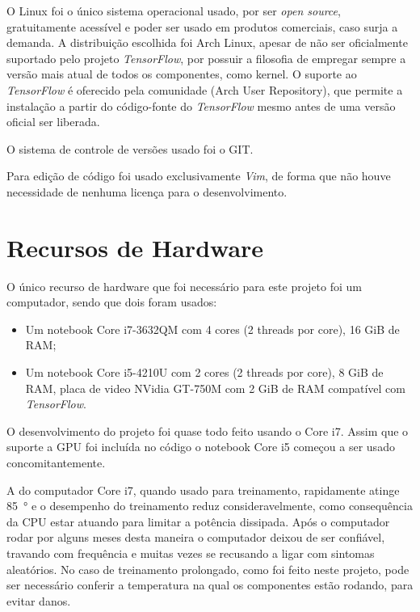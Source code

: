 O Linux foi o único sistema operacional usado, por ser \emph{open source},
gratuitamente acessível e poder ser usado em produtos comerciais, caso surja a
demanda. A distribuição escolhida foi Arch Linux, apesar de não ser
oficialmente suportado pelo projeto \emph{TensorFlow}, por possuir a filosofia
de empregar sempre a versão mais atual de todos os componentes, como kernel. O
suporte ao \emph{TensorFlow} é oferecido pela comunidade
 (Arch User Repository), que permite a instalação a partir do
código-fonte do \emph{TensorFlow} mesmo antes de uma versão oficial ser liberada.

O sistema de controle de versões usado foi o GIT.

Para edição de código foi usado exclusivamente \emph{Vim}, de forma que não
houve necessidade de nenhuma licença para o desenvolvimento.

\section{Recursos de Hardware} \label{sec:cap5_hw}

O único recurso de hardware que foi necessário para este projeto foi
um computador, sendo que dois foram usados:

\begin{itemize}
\item Um notebook Core i7-3632QM com 4 cores (2 threads por core), 16 GiB
	de RAM;
\item Um notebook Core i5-4210U com 2 cores (2 threads por core), 8 GiB de RAM,
	placa de video NVidia GT-750M com 2 GiB de RAM compatível com
	\emph{TensorFlow}.
\end{itemize}

O desenvolvimento do projeto foi quase todo feito usando o Core i7. Assim que
o suporte a GPU foi incluída no código o notebook Core i5 começou a ser usado
concomitantemente.

A  do computador Core i7, quando usado para treinamento, rapidamente
atinge \SI{85}{\degree} e o desempenho do treinamento reduz consideravelmente,
como consequência da CPU estar atuando para limitar a potência dissipada. Após
o computador rodar por alguns meses desta maneira o computador deixou de ser
confiável, travando com frequência e muitas vezes se recusando a ligar com
sintomas aleatórios. No caso de treinamento prolongado, como foi feito neste
projeto, pode ser necessário conferir a temperatura na qual os componentes
estão rodando, para evitar danos.

